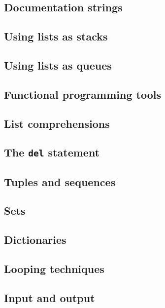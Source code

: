 \documentclass[article,A4,12pt]{llncs}
\begin{document}
\subsection{Documentation strings}




\subsection{Using lists as stacks}


\subsection{Using lists as queues}


\subsection{Functional programming tools}


\subsection{List comprehensions}


\subsection{The {\tt del} statement}


\subsection{Tuples and sequences}


\subsection{Sets}


\subsection{Dictionaries}


\subsection{Looping techniques}


\subsection{Input and output}
\end{document}
